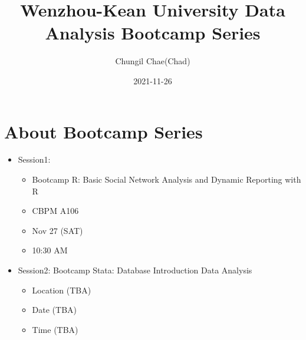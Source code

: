 \documentclass[
]{book}
\title{Wenzhou-Kean University Data Analysis Bootcamp Series}
\author{Chungil Chae(Chad)}
\date{2021-11-26}
\providecommand{\tightlist}{%
  \setlength{\itemsep}{0pt}\setlength{\parskip}{0pt}}
\begin{document}
\maketitle

{
\setcounter{tocdepth}{1}
\tableofcontents
}
\hypertarget{about-bootcamp-series}{%
\chapter{About Bootcamp Series}\label{about-bootcamp-series}}

\begin{itemize}
\tightlist
\item
  Session1:

  \begin{itemize}
  \tightlist
  \item
    Bootcamp R: Basic Social Network Analysis and Dynamic Reporting with R
  \item
    CBPM A106
  \item
    Nov 27 (SAT)
  \item
    10:30 AM
  \end{itemize}
\item
  Session2: Bootcamp Stata: Database Introduction Data Analysis

  \begin{itemize}
  \tightlist
  \item
    Location (TBA)
  \item
    Date (TBA)
  \item
    Time (TBA)
  \end{itemize}
\end{itemize}
\end{document}
